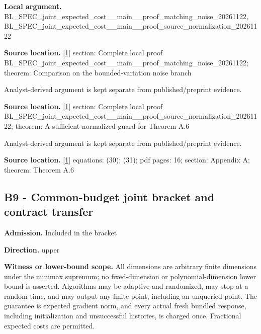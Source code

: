 \documentclass[10pt,a4paper]{article}
\begin{document}
\textbf{Local argument.} BL\_SPEC\_joint\_expected\_c\allowbreak{}ost\_\_main\_\_proof\_matchin\allowbreak{}g\_noise\_20261122, BL\_SPEC\_joint\_expected\_c\allowbreak{}ost\_\_main\_\_proof\_source\_\allowbreak{}normalization\_20261122



\textbf{Source location.} \href{https://arxiv.org/pdf/2610.03633v2}{[1]} section: Complete local proof BL\_SPEC\_joint\_expected\_c\allowbreak{}ost\_\_main\_\_proof\_matchin\allowbreak{}g\_noise\_20261122; theorem: Comparison on the bounded-variation noise branch



Analyst-derived argument is kept separate from published/preprint evidence.



\textbf{Source location.} \href{https://arxiv.org/pdf/2610.03633v2}{[1]} section: Complete local proof BL\_SPEC\_joint\_expected\_c\allowbreak{}ost\_\_main\_\_proof\_source\_\allowbreak{}normalization\_20261122; theorem: A sufficient normalized guard for Theorem A.6



Analyst-derived argument is kept separate from published/preprint evidence.



\textbf{Source location.} \href{https://arxiv.org/pdf/2610.03633v2}{[1]} equations: (30); (31); pdf pages: 16; section: Appendix A; theorem: Theorem A.6



\subsection{B9 - Common-budget joint bracket and contract transfer}


\textbf{Admission.} Included in the bracket



\textbf{Direction.} upper



\textbf{Witness or lower-bound scope.} All dimensions are arbitrary finite dimensions under the minimax supremum; no fixed-dimension or polynomial-dimension lower bound is asserted. Algorithms may be adaptive and randomized, may stop at a random time, and may output any finite point, including an unqueried point. The guarantee is expected gradient norm, and every actual fresh bundled response, including initialization and unsuccessful histories, is charged once. Fractional expected costs are permitted.
\end{document}
